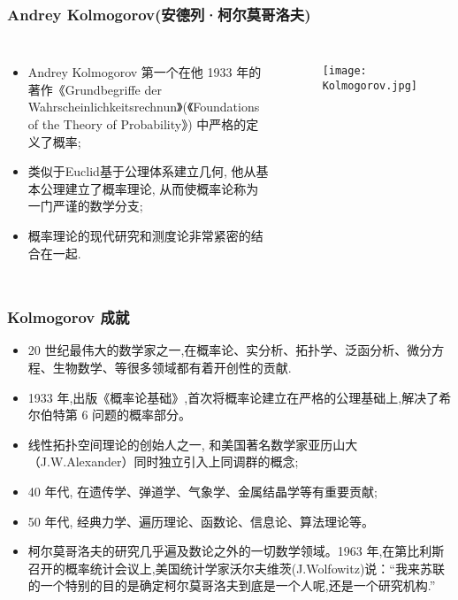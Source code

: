 \begin{frame}
  \frametitle{{\rm Andrey Kolmogorov}(安德列·柯尔莫哥洛夫)}
  \begin{columns}
    \column{6cm}
    \begin{itemize}[<+-|alert@+>]
    \item {\rm Andrey Kolmogorov} 第一个在他 1933 年的著作{\rm 《Grundbegriffe der Wahrscheinlichkeitsrechnun》(《Foundations of the Theory of Probability》)} 中严格的定义了概率;
    \item 类似于{\rm Euclid}基于公理体系建立几何, 他从基本公理建立了概率理论, 从而使概率论称为一门严谨的数学分支;
    \item 概率理论的现代研究和测度论非常紧密的结合在一起.

    \end{itemize}

    \column{5cm}

    \begin{figure}[htbp]\nonumber
      \centering
      \texttt{[image: Kolmogorov.jpg]}


    \end{figure}
  \end{columns}
\end{frame}
\begin{frame}
  \frametitle{{\rm Kolmogorov} 成就}
  \vspace{-0.4cm}
  {\small\begin{itemize}[<+-|alert@+>]
    \item 20 世纪最伟大的数学家之一,在概率论、实分析、拓扑学、泛函分析、微分方程、生物数学、等很多领域都有着开创性的贡献.

    \item 1933 年,出版《概率论基础》,首次将概率论建立在严格的公理基础上,解决了希尔伯特第 6 问题的概率部分。
    \item 线性拓扑空间理论的创始人之一, 和美国著名数学家亚历山大（{\rm J.W.Alexander}）同时独立引入上同调群的概念;

    \item 40 年代, 在遗传学、弹道学、气象学、金属结晶学等有重要贡献;
    \item 50 年代, 经典力学、遍历理论、函数论、信息论、算法理论等。

    \item 柯尔莫哥洛夫的研究几乎遍及数论之外的一切数学领域。1963 年,在第比利斯召开的概率统计会议上,美国统计学家沃尔夫维茨({\rm J.Wolfowitz})说：``我来苏联的一个特别的目的是确定柯尔莫哥洛夫到底是一个人呢,还是一个研究机构.”


    \end{itemize}}
\end{frame}

